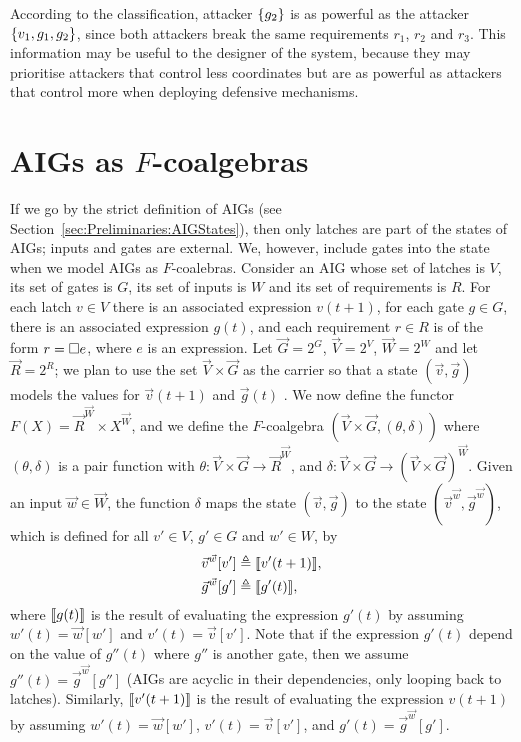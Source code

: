 According to the classification, attacker $\left\{g_2\right\}$ is as powerful as the attacker $\left\{v_1,g_1,g_2\right\}$, since both attackers break the same requirements $r_1$, $r_2$ and $r_3$. This information may be useful to the designer of the system, because they may prioritise attackers that control less coordinates but are as powerful as attackers that control more when deploying defensive mechanisms.


\section{AIGs as \texorpdfstring{$F$-coalgebras}{F-coalgebras}}
\label{sec:Classification:LatentBehaviours}
If we go by the strict definition of AIGs (see Section~\ref{sec:Preliminaries:AIGStates}), then only latches are part of the states of AIGs; inputs and gates are external. We, however, include gates into the state when we model AIGs as $F$-coalebras. Consider an AIG whose set of latches is $V$, its set of gates is $G$, its set of inputs is $W$ and its set of requirements is ${R}$. For each latch $v\in V$ there is an associated expression $v(t+1)$, for each gate $g\in G$, there is an associated expression $g(t)$, and each requirement $r\in {R}$ is of the form $r={{\square}} e$, where $e$ is an expression. 
Let $\vec{G}=2^G$, $\vec{V}=2^{V}$, $\vec{W}=2^W$ and let $\vec{{R}}=2^{{R}}$; we plan to use the set $\vec{V}\times \vec{G}$ as the carrier so that a state $(\vec{v},\vec{g})$ models the values for $\vec{v}(t+1)$ and $\vec{g}(t)$%
. We now define the functor $F(X)=\vec{{R}}^{\vec{W}}\times X^{\vec{W}}$, and we define the $F$-coalgebra $(\vec{V}\times\vec{G},(\theta,\delta))$ where $(\theta,\delta)$ is a pair function with $\theta\colon \vec{V}\times \vec{G}\rightarrow \vec{{R}}^{\vec{W}}$, and $\delta\colon\vec{V}\times \vec{G} \rightarrow (\vec{V}\times \vec{G})^{\vec{W}}$. Given an input $\vec{w}\in \vec{W}$, the function $\delta$ maps the state $(\vec{v},\vec{g})$ to the state $(\vec{v}^{\vec{w}}, \vec{g}^{\vec{w}})$, which is defined for all $v'\in V$, $g'\in G$ and $w'\in W$, by 
\begin{align}
	\vec{v}^{\vec{w}}[v']&\triangleq {{\llbracket v'(t+1)\rrbracket}},\\
	\vec{g}^{\vec{w}}[g']&\triangleq {{\llbracket g'(t)\rrbracket}},
\end{align}
where ${{\llbracket g(t)\rrbracket}}$ is the result of evaluating the expression $g'(t)$ by assuming $w'(t)=\vec{w}[w']$ and $v'(t)=\vec{v}[v']$. Note that if the expression $g'(t)$ depend on the value of $g''(t)$ where $g''$ is another gate, then we assume $g''(t)=\vec{g}^{\vec{w}}[g'']$ (AIGs are acyclic in their dependencies, only looping back to latches). Similarly, ${{\llbracket v'(t+1)\rrbracket}}$ is the result of evaluating the expression $v(t+1)$ by assuming $w'(t)=\vec{w}[w']$, $v'(t)=\vec{v}[v']$, and $g'(t)=\vec{g}^{\vec{w}}[g']$. %

